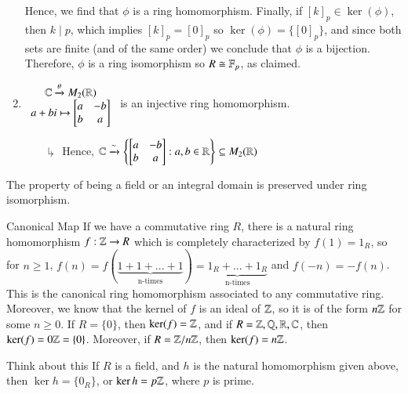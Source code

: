 \documentclass[12pt, a4paper, twoside, openright, titlepage]{book}
\begin{document}
\begin{eg}{}{}
\begin{enumerate}
\begin{proof*}{}{}
            Hence, we find that $\phi$ is a ring homomorphism. Finally, if $[k]_p \in \ker(\phi)$, then $k\;\vert\;p$, which implies $[k]_p = [0]_p$ so $\ker(\phi) = \{[0]_p\}$, and since both sets are finite (and of the same order) we conclude that $\phi$ is a bijection. Therefore, $\phi$ is a ring isomorphism so $R \cong \mathbb F_p$, as claimed.
        \end{proof*}
        \item $\begin{array}{c} \mathbb C\xrightarrow{\theta}M_2(\mathbb R) \\ a+bi\mapsto \begin{bmatrix} a & -b \\ b & a\end{bmatrix} \end{array}$ is an injective ring homomorphism.
        \begin{enumerate}
            \item[$\drsh$] Hence, $\mathbb C \xrightarrow{\sim} \left\{\begin{bmatrix} a & -b \\ b & a\end{bmatrix}:a,b \in \mathbb R\right\}\subseteq M_2(\mathbb R)$ 
        \end{enumerate}
    \end{enumerate}
\end{eg}

\begin{rmk}{}{}
    The property of being a field or an integral domain is preserved under ring isomorphism.
\end{rmk}


\begin{rmk}{Canonical Map}{}
        If we have a commutative ring $R$, there is a natural ring homomorphism $f:\mathbb Z\rightarrow R$ which is completely characterized by $f(1) = 1_R$, so for $n \geq 1$, $f(n) = f(\underbrace{1+1+...+1}_{\text{n-times}}) = \underbrace{1_R+...+1_R}_{\text{n-times}}$ and $f(-n) = -f(n)$. This is the canonical ring homomorphism associated to any commutative ring. Moreover, we know that the kernel of $f$ is an ideal of $\mathbb Z$, so it is of the form $n\mathbb Z$ for some $n \geq 0$. If $R = \{0\}$, then $\ker(f) =\mathbb Z$, and if $R = \mathbb Z,\mathbb Q,\mathbb R,\mathbb C$, then $\ker(f) = 0\mathbb Z = \{0\}$. Moreover, if $R= \mathbb Z/n\mathbb Z$, then $\ker(f) = n\mathbb Z$.
\end{rmk}

\begin{rmk}{Think about this}{}
        If $R$ is a field, and $h$ is the natural homomorphism given above, then $\ker h = \{0_R\}$, or $\ker h = p\mathbb Z$, where $p$ is prime.
\end{rmk}
\end{document}
